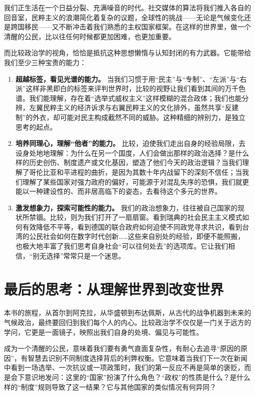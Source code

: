 \documentclass[a5paper, 11pt, openany]{ctexbook}
\begin{document}
我们正生活在一个日益分裂、充满噪音的时代。社交媒体的算法将我们推入各自的回音室，民粹主义的浪潮简化着复杂的议题，全球性的挑战——无论是气候变化还是跨国移民——又不断冲击着我们熟悉的主权国家框架。在这样的世界里，做一个清醒的公民，比以往任何时候都更加困难，也更加重要。

而比较政治学的视角，恰恰是抵抗这种思想懒惰与认知封闭的有力武器。它能带给我们至少三种宝贵的能力：
\begin{enumerate}
    \item \textbf{超越标签，看见光谱的能力。} 当我们习惯于用“民主”与“专制”、“左派”与“右派”这样非黑即白的标签来评判世界时，比较的视野让我们看到其间的万千色谱。我们能理解，存在着“选举式威权主义”这样模糊的混合政体；我们也能分辨，左翼民粹主义的经济诉求与右翼民粹主义的文化排外，虽然共享“反建制”的外衣，却可能对民主构成截然不同的威胁。这种精细的辨别力，是独立思考的起点。
    \item \textbf{培养同理心，理解“他者”的能力。} 比较，迫使我们走出自身的经验局限，去设身处地地理解：为什么在另一个国度，人们会做出那样的政治选择？是什么样的历史创伤、制度遗产或文化基因，塑造了他们今天的政治逻辑？当我们理解了哥伦比亚和平进程的曲折，是因为其数十年内战留下的深刻不信任；当我们理解了某些国家对强力政府的偏好，可能源于对混乱失序的恐惧，我们就更能以一种建设性的、而非居高临下的姿态，去看待这个多元的世界。
    \item \textbf{激发想象力，探索可能性的能力。} 我们的政治想象力，往往被自己国家的现状所禁锢。比较，则为我们打开了一扇扇窗。看到瑞典的社会民主主义模式如何有效降低不平等，看到德国的联合政府如何迫使不同政党寻求共识，看到台湾的公民社会如何在数字时代创新……这些来自别处的经验，即便不能照搬，也极大地丰富了我们思考自身社会“可以往何处去”的选项库。它让我们相信，“别无选择”常常只是一个迷思。
\end{enumerate}

\section*{最后的思考：从理解世界到改变世界}

本书的旅程，从首尔到阿克拉，从华盛顿到布达佩斯，从古代的战争机器到未来的气候政治，最终要回归到我们每个人的内心。比较政治学不仅仅是一门关于远方的学问，它更是一面镜子，映照出我们自身的处境、偏见与可能性。

成为一个清醒的公民，意味着我们要有勇气直面复杂性，有耐心去追寻“原因的原因”，有智慧去识别不同制度选择背后的利弊权衡。它意味着当我们下一次在新闻中看到一场选举、一次抗议或一项政策时，我们的第一反应不再是简单的褒贬，而是会下意识地发问：这里的“国家”扮演了什么角色？“政权”的性质是什么？是什么样的“制度”规则导致了这一结果？它与其他国家的类似情况有何异同？
\end{document}
